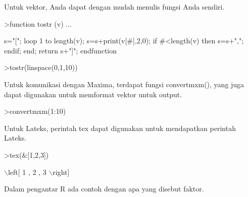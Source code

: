 \documentclass[a4paper,10pt]{article}
\begin{document}
\begin{eulernotebook}
\begin{eulercomment}
\begin{eulercomment}
\begin{eulercomment}
\begin{eulercomment}
\begin{eulercomment}
\begin{eulercomment}
\begin{eulercomment}
\begin{eulercomment}
\begin{eulercomment}
\begin{eulercomment}
\begin{eulercomment}
\begin{eulercomment}
\begin{eulercomment}
\begin{eulercomment}
\begin{eulercomment}
\begin{eulercomment}
\begin{eulercomment}
\begin{eulercomment}
\begin{eulercomment}
Untuk vektor, Anda dapat dengan mudah menulis fungsi Anda sendiri.
\end{eulercomment}
\begin{eulerprompt}
>function tostr (v) ...
\end{eulerprompt}
\begin{eulerudf}
  s="[";
  loop 1 to length(v);
     s=s+print(v[#],2,0);
     if #<length(v) then s=s+","; endif;
  end;
  return s+"]";
  endfunction
\end{eulerudf}
\begin{eulerprompt}
>tostr(linspace(0,1,10))
\end{eulerprompt}
\begin{euleroutput}
  [0.00,0.10,0.20,0.30,0.40,0.50,0.60,0.70,0.80,0.90,1.00]
\end{euleroutput}
\begin{eulercomment}
Untuk komunikasi dengan Maxima, terdapat fungsi convertmxm(), yang
juga dapat digunakan untuk memformat vektor untuk output.
\end{eulercomment}
\begin{eulerprompt}
>convertmxm(1:10)
\end{eulerprompt}
\begin{euleroutput}
  [1,2,3,4,5,6,7,8,9,10]
\end{euleroutput}
\begin{eulercomment}
Untuk Lateks, perintah tex dapat digunakan untuk mendapatkan perintah
Lateks.
\end{eulercomment}
\begin{eulerprompt}
>tex(&[1,2,3])
\end{eulerprompt}
\begin{euleroutput}
  \(\backslash\)left[ 1 , 2 , 3 \(\backslash\)right] 
\end{euleroutput}
\begin{eulercomment}
Dalam pengantar R ada contoh dengan apa yang disebut faktor.


\end{eulercomment}
\end{eulercomment}
\end{eulercomment}
\end{eulercomment}
\end{eulercomment}
\end{eulercomment}
\end{eulercomment}
\end{eulercomment}
\end{eulercomment}
\end{eulercomment}
\end{eulercomment}
\end{eulercomment}
\end{eulercomment}
\end{eulercomment}
\end{eulercomment}
\end{eulercomment}
\end{eulercomment}
\end{eulercomment}
\end{eulercomment}
\end{eulernotebook}
\end{document}
